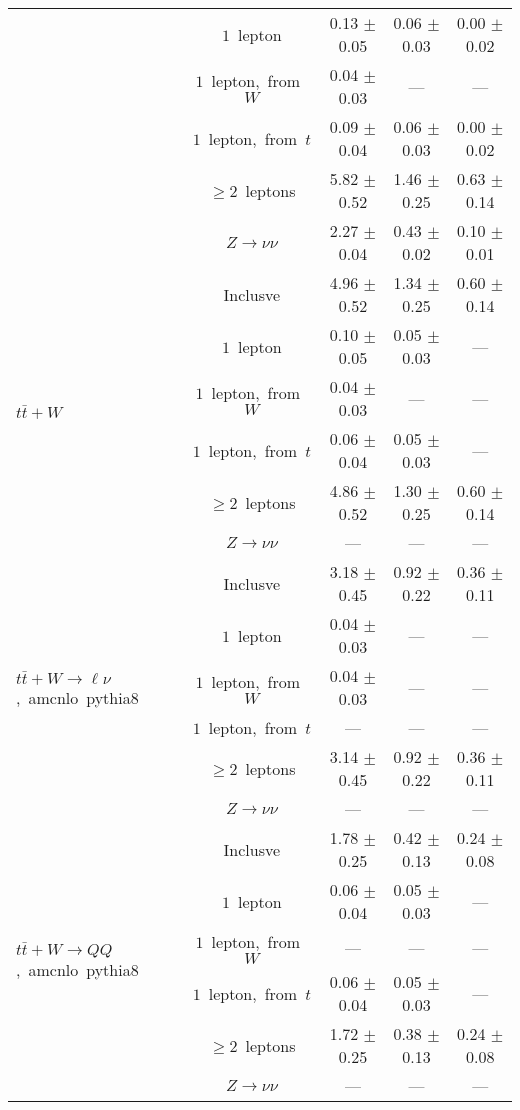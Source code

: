 \documentclass{article}
\begin{document}
\begin{longtable}{|l|c|c|c|c|}
 & $1$~lepton  & 0.13 $\pm$ 0.05  & 0.06 $\pm$ 0.03  & 0.00 $\pm$ 0.02 \\* 
 & $1$~lepton,~from~$W$  & 0.04 $\pm$ 0.03  & ---  & --- \\* 
 & $1$~lepton,~from~$t$  & 0.09 $\pm$ 0.04  & 0.06 $\pm$ 0.03  & 0.00 $\pm$ 0.02 \\* 
 & $\ge2$~leptons  & 5.82 $\pm$ 0.52  & 1.46 $\pm$ 0.25  & 0.63 $\pm$ 0.14 \\* 
 & $Z\rightarrow\nu\nu$  & 2.27 $\pm$ 0.04  & 0.43 $\pm$ 0.02  & 0.10 $\pm$ 0.01 \\* 
\hline 
\multirow{6}{*}{$t\bar{t}+W$} & Inclusve  & 4.96 $\pm$ 0.52  & 1.34 $\pm$ 0.25  & 0.60 $\pm$ 0.14 \\* 
 & $1$~lepton  & 0.10 $\pm$ 0.05  & 0.05 $\pm$ 0.03  & --- \\* 
 & $1$~lepton,~from~$W$  & 0.04 $\pm$ 0.03  & ---  & --- \\* 
 & $1$~lepton,~from~$t$  & 0.06 $\pm$ 0.04  & 0.05 $\pm$ 0.03  & --- \\* 
 & $\ge2$~leptons  & 4.86 $\pm$ 0.52  & 1.30 $\pm$ 0.25  & 0.60 $\pm$ 0.14 \\* 
 & $Z\rightarrow\nu\nu$  & ---  & ---  & --- \\* 
\hline 
\multirow{6}{*}{$t\bar{t}+W{\rightarrow}{\ell}{\nu}$,~amcnlo~pythia8} & Inclusve  & 3.18 $\pm$ 0.45  & 0.92 $\pm$ 0.22  & 0.36 $\pm$ 0.11 \\* 
 & $1$~lepton  & 0.04 $\pm$ 0.03  & ---  & --- \\* 
 & $1$~lepton,~from~$W$  & 0.04 $\pm$ 0.03  & ---  & --- \\* 
 & $1$~lepton,~from~$t$  & ---  & ---  & --- \\* 
 & $\ge2$~leptons  & 3.14 $\pm$ 0.45  & 0.92 $\pm$ 0.22  & 0.36 $\pm$ 0.11 \\* 
 & $Z\rightarrow\nu\nu$  & ---  & ---  & --- \\* 
\hline 
\multirow{6}{*}{$t\bar{t}+W{\rightarrow}QQ$,~amcnlo~pythia8} & Inclusve  & 1.78 $\pm$ 0.25  & 0.42 $\pm$ 0.13  & 0.24 $\pm$ 0.08 \\* 
 & $1$~lepton  & 0.06 $\pm$ 0.04  & 0.05 $\pm$ 0.03  & --- \\* 
 & $1$~lepton,~from~$W$  & ---  & ---  & --- \\* 
 & $1$~lepton,~from~$t$  & 0.06 $\pm$ 0.04  & 0.05 $\pm$ 0.03  & --- \\* 
 & $\ge2$~leptons  & 1.72 $\pm$ 0.25  & 0.38 $\pm$ 0.13  & 0.24 $\pm$ 0.08 \\* 
 & $Z\rightarrow\nu\nu$  & ---  & ---  & --- \\* 

\end{longtable}
\end{document}
